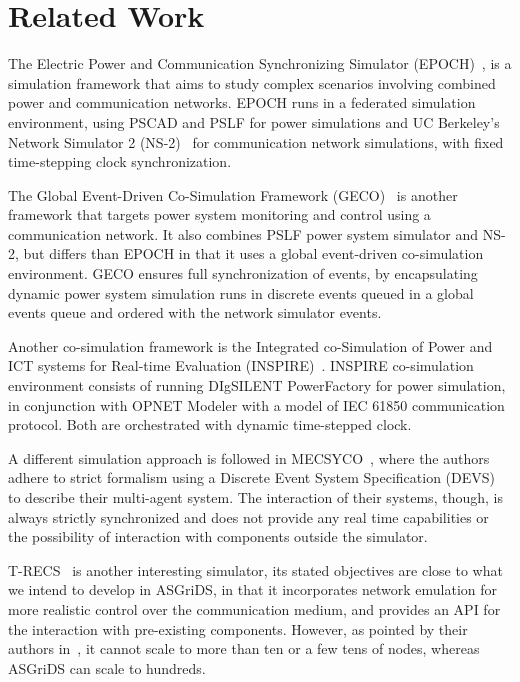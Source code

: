 \documentclass[conference]{IEEEtran}
\begin{document}
\section{Related Work} \label{related_work}
The Electric Power and Communication Synchronizing Simulator (EPOCH)~\cite{hopkinsonEPOCHSPlatformAgentbased2006}, is a simulation framework that aims to study complex scenarios involving combined power and communication networks. EPOCH runs in a federated simulation environment, using PSCAD and PSLF for power simulations and UC Berkeley’s Network Simulator 2 (NS-2)~\cite{NetworkSimulatorNs2} for communication network simulations, with fixed time-stepping clock synchronization.

The Global Event-Driven Co-Simulation Framework (GECO)~\cite{linGECOGlobalEventDriven} is another framework that targets power system monitoring and control using a communication network. 
It also combines PSLF power system simulator and NS-2, but differs than EPOCH in that it uses a global event-driven co-simulation environment. GECO ensures full synchronization of events, by encapsulating dynamic power system simulation runs in discrete events queued in a global events queue and ordered with the network simulator events.

Another co-simulation framework is the Integrated co-Simulation of Power and ICT systems for Real-time Evaluation (INSPIRE)~\cite{georgINSPIREIntegratedCosimulation2013}. INSPIRE co-simulation environment consists of running DIgSILENT PowerFactory for power simulation, in conjunction with OPNET Modeler with a model of IEC 61850 communication protocol. Both are orchestrated with dynamic time-stepped clock.

A different simulation approach is followed in MECSYCO~\cite{vaubourgMultiagentMultiModelSimulation2015}, where the authors adhere to strict formalism using a Discrete Event System Specification (DEVS) to describe their multi-agent system. The interaction of their systems, though, is always strictly synchronized and does not provide any real time capabilities or the possibility of interaction with components outside the simulator.

T-RECS~\cite{acharaTRECSVirtualCommissioning2018} is another interesting simulator, its stated objectives are close to what we intend to develop in ASGriDS, in that it incorporates network emulation for more realistic control over the communication medium, and provides an API for the interaction with pre-existing components. However, as pointed by their authors in~\cite{acharaTRECSVirtualCommissioning2018}, it cannot scale to more than ten or a few tens of nodes, whereas ASGriDS can scale to hundreds. 
\end{document}
